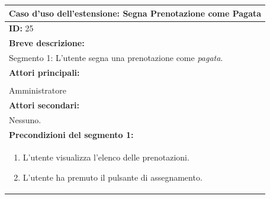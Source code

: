 \documentclass{article}
\begin{document}
                \begin{table}[H]
                    \begin{tabular}{|p{\linewidth}|}
                        \hline
                        \cellcolor{gray!100}
                        \color{white}
                        \centerline{\textbf{Caso d'uso dell'estensione:} Segna Prenotazione come Pagata} \\
                        \hline
                        \textbf{ID:} 25 \\
                        \hline
                        \cellcolor{gray!20}
                        \textbf{Breve descrizione:} \\
                        \cellcolor{gray!20}
                        Segmento 1: L'utente segna una prenotazione come \emph{pagata}. \\
                        \hline
                        \textbf{Attori principali:} \\
                        \begin{minipage}{\linewidth}
                            Biglietteria \\
                            Amministratore
                        \end{minipage}
                        \vspace{-5pt} \\
                        \hline
                        \textbf{Attori secondari:} \\
                        Nessuno. \\
                        \hline
                        \cellcolor{gray!20}
                        \textbf{Precondizioni del segmento 1:} \\
                        \cellcolor{gray!20}
                        \begin{minipage}{\linewidth}
                            \begin{enumerate}
                                \item L'utente visualizza l'elenco delle prenotazioni.
                                \item L'utente ha premuto il pulsante di assegnamento.
                            \end{enumerate}
                        \end{minipage}
                        \vspace{-5pt} \\

\end{tabular}
\end{table}
\end{document}
